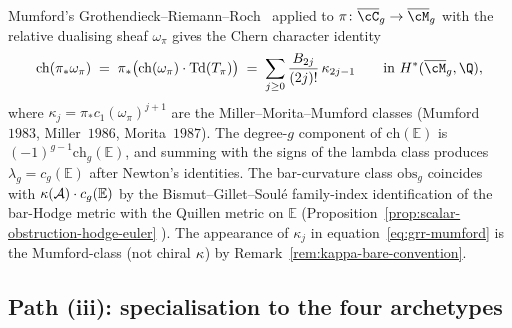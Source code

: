 \begin{proposition}
\label{prop:grr-verification-all-g}
Mumford's Grothendieck--Riemann--Roch~\cite{Mumford83} applied to
$\pi\colon\overline{\cC}_{g}\to\overline{\cM}_{g}$ with the relative
dualising sheaf $\omega_{\pi}$ gives the Chern character identity
\begin{equation}\label{eq:grr-mumford}
\mathrm{ch}(\pi_{*}\omega_{\pi})
\;=\;
\pi_{*}\bigl(\mathrm{ch}(\omega_{\pi})\cdot\mathrm{Td}(T_{\pi})\bigr)
\;=\;
\sum_{j\geq 0}\frac{B_{2j}}{(2j)!}\,\kappa_{2j-1}
\qquad \textup{in } H^{*}(\overline{\cM}_{g},\Q),
\end{equation}
where $\kappa_{j}=\pi_{*}c_{1}(\omega_{\pi})^{j+1}$ are the
Miller--Morita--Mumford classes \textup{(}Mumford~$1983$,
Miller~$1986$, Morita~$1987$\textup{)}. The
degree-$g$ component of $\mathrm{ch}(\mathbb{E})$ is
$(-1)^{g-1}\mathrm{ch}_{g}(\mathbb{E})$, and summing with the
signs of the lambda class produces
$\lambda_{g}=c_{g}(\mathbb{E})$ after Newton's identities. The
bar-curvature class $\mathrm{obs}_{g}$ coincides with
$\kappa(\mathcal{A})\cdot c_{g}(\mathbb{E})$ by the Bismut--Gillet--Soul\'e
family-index identification of the bar-Hodge metric with the
Quillen metric on $\mathbb{E}$
\textup{(}Proposition~\textup{\ref{prop:scalar-obstruction-hodge-euler}}%
\textup{)}. The appearance of $\kappa_{j}$ in
equation~\eqref{eq:grr-mumford} is the Mumford-class (not chiral
$\kappa$) by Remark~\ref{rem:kappa-bare-convention}.
\end{proposition}

\subsection{Path (iii): specialisation to the four archetypes}

